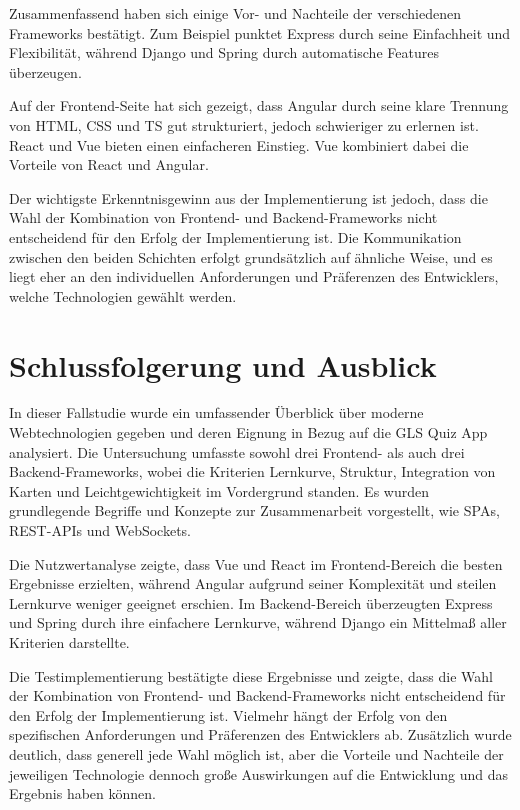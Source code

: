 \documentclass[biblatex]{lni}
\begin{document}
Zusammenfassend haben sich einige Vor- und Nachteile der verschiedenen Frameworks bestätigt.
Zum Beispiel punktet Express durch seine Einfachheit und Flexibilität, während Django und Spring durch automatische Features überzeugen.

Auf der Frontend-Seite hat sich gezeigt, dass Angular durch seine klare Trennung von \ac{HTML}, \ac{CSS} und \ac{TS} gut strukturiert,
jedoch schwieriger zu erlernen ist.
React und Vue bieten einen einfacheren Einstieg.
Vue kombiniert dabei die Vorteile von React und Angular.

Der wichtigste Erkenntnisgewinn aus der Implementierung ist jedoch,
dass die Wahl der Kombination von Frontend- und Backend-Frameworks nicht entscheidend für den Erfolg der Implementierung ist.
Die Kommunikation zwischen den beiden Schichten erfolgt grundsätzlich auf ähnliche Weise,
und es liegt eher an den individuellen Anforderungen und Präferenzen des Entwicklers, welche Technologien gewählt werden.

\section{Schlussfolgerung und Ausblick}

In dieser Fallstudie wurde ein umfassender Überblick über moderne Webtechnologien gegeben
und deren Eignung in Bezug auf die GLS Quiz App analysiert.
Die Untersuchung umfasste sowohl drei Frontend- als auch drei Backend-Frameworks,
wobei die Kriterien Lernkurve, Struktur, Integration von Karten und Leichtgewichtigkeit im Vordergrund standen.
Es wurden grundlegende Begriffe und Konzepte zur Zusammenarbeit vorgestellt, wie \ac{SPA}s, \ac{REST}-\ac{API}s und WebSockets.

Die Nutzwertanalyse zeigte, dass Vue und React im Frontend-Bereich die besten Ergebnisse erzielten,
während Angular aufgrund seiner Komplexität und steilen Lernkurve weniger geeignet erschien.
Im Backend-Bereich überzeugten Express und Spring durch ihre einfachere Lernkurve,
während Django ein Mittelmaß aller Kriterien darstellte.

Die Testimplementierung bestätigte diese Ergebnisse und zeigte,
dass die Wahl der Kombination von Frontend- und Backend-Frameworks nicht entscheidend für den Erfolg der Implementierung ist.
Vielmehr hängt der Erfolg von den spezifischen Anforderungen und Präferenzen des Entwicklers ab.
Zusätzlich wurde deutlich, dass generell jede Wahl möglich ist,
aber die Vorteile und Nachteile der jeweiligen Technologie dennoch große Auswirkungen
auf die Entwicklung und das Ergebnis haben können.
\end{document}
